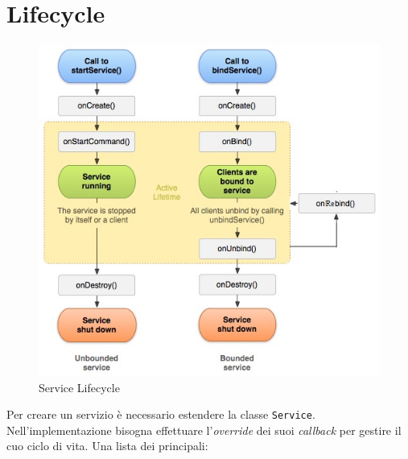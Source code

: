 \documentclass{book}
\begin{document}
\section{Lifecycle}
\begin{figure}
    \centering
    \includegraphics[scale = 0.6]{res/img/service_lifecycle.jpg}
    \caption{Service Lifecycle}
    \label{fig:my_label}
\end{figure}
Per creare un servizio è necessario estendere la classe \texttt{Service}. Nell'implementazione bisogna effettuare l'\textit{override} dei suoi \textit{callback} per gestire il cuo ciclo di vita. Una lista dei principali:
\end{document}
